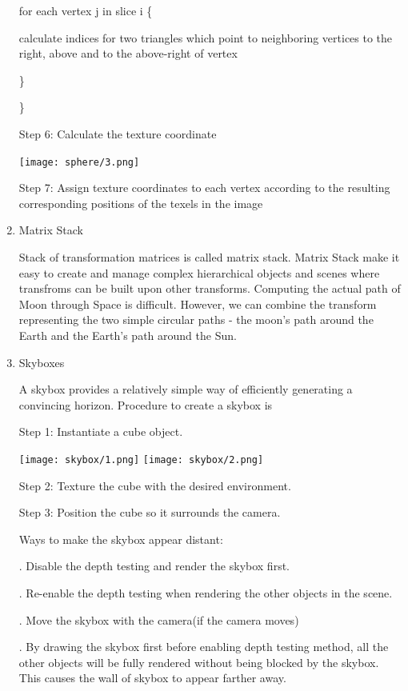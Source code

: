 \documentclass[12pt]{article}
\begin{document}
\begin{enumerate}
	\qquad for each vertex j in slice i \{

	\qquad \qquad calculate indices for two triangles which point to neighboring vertices to the right, above and to the above-right of vertex
	
	\qquad \}
	
	\}

	Step 6: Calculate the texture coordinate
	
	\begin{center}
	\texttt{[image: sphere/3.png]}
	\end{center}	
	
	Step 7: Assign texture coordinates to each vertex according to the resulting corresponding positions of the texels in the image	
	
	\item Matrix Stack
	
	Stack of transformation matrices is called matrix stack. Matrix Stack make it easy to create and manage complex hierarchical objects and scenes where transfroms can be built upon other transforms. Computing the actual path of Moon through Space is difficult. However, we can combine the transform representing the two simple circular paths - the moon's path around the Earth and the Earth's path around the Sun.	
	
	\item Skyboxes
	
	A skybox provides a relatively simple way of efficiently generating a convincing horizon. Procedure to create a skybox is
	
	\qquad Step 1: Instantiate a cube object.
	
	\begin{center}
	\texttt{[image: skybox/1.png]}
	\texttt{[image: skybox/2.png]}
	\end{center}	
	
	\qquad Step 2: Texture the cube with the desired environment.
	
	\qquad Step 3: Position the cube so it surrounds the camera.
	
	Ways to make the skybox appear distant:
	
	. Disable the depth testing and render the skybox first.

	. Re-enable the depth testing when rendering the other objects in the scene.

	. Move the skybox with the camera(if the camera moves)
	
	. By drawing the skybox first before enabling depth testing method, all the other objects will be fully rendered without being blocked by the skybox. This causes the wall of skybox to appear farther away.


\end{enumerate}
\end{document}
